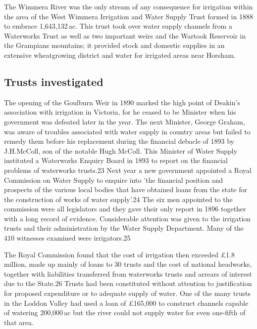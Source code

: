 The Wimmera River was the only stream of any consequence for
irrigation within the area of the West Wimmera Irrigation and Water
Supply Trust formed in 1888 to embrace 1,643,132\,ac. This trust took
over water supply channels from a Waterworks Trust as well as two
important weirs and the Wartook Reservoir in the Grampians mountains;
it provided stock and domestic supplies in an extensive wheatgrowing
district and water for irrigated areas near Horsham.

\subsection{Trusts investigated}

The opening of the Goulburn Weir in 1890 marked the high point of
Deakin's association with irrigation in Victoria, for he ceased to be
Minister when his government was defeated later in the year. The next
Minister, George Graham, was aware of troubles associated with water
supply in country areas but failed to remedy them before his
replacement during the financial debacle of 1893 by J.H.McColl, son of
the notable Hugh McColl. This Minister of Water Supply instituted a
Waterworks Enquiry Board in 1893 to report on the financial problems
of waterworks trusts.23 Next year a new government appointed a Royal
Commission on Water Supply to enquire into 'the financial position and
prospects of the various local bodies that have obtained loans from
the state for the construction of works of water supply'.24 The six
men appointed to the commission were all legislators and they gave
their only report in 1896 together with a long record of
evidence. Considerable attention was given to the irrigation trusts
and their administration by the Water Supply Department. Many of the
410 witnesses examined were irrigators.25

The Royal Commission found that the cost of irrigation then exceeded
\pounds1.8 million, made up mainly of loans to 30 trusts and the cost of
national headworks, together with liabilities transferred from
waterworks trusts and arrears of interest due to the State.26 Trusts
had been constituted without attention to justification for proposed
expenditure or to adequate supply of water. One of the many trusts in
the Loddon Valley had used a loan of \pounds165,000 to construct
channels capable of watering 200,000\,ac but the river could not
supply water for even one-fifth of that area.

